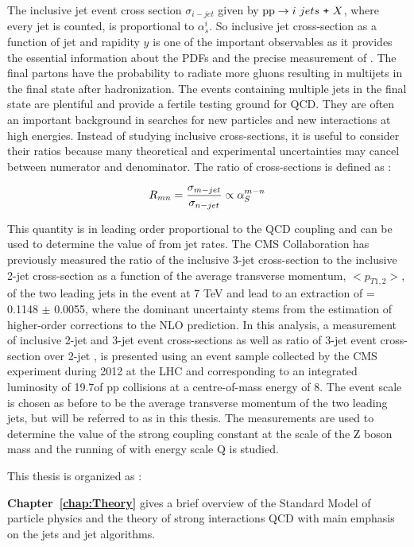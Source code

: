 The inclusive jet event cross section $\sigma_{i-jet}$ given by ${{\rm pp}\to i~jets~\texttt{+}~ X}$, where every jet is counted, is proportional to $\alpha^{i}_{s}$. So inclusive jet cross-section as a function of jet \pt and rapidity $y$ is one of the important observables as it provides the essential information about the PDFs and the precise measurement of \alps. The final partons have the probability to radiate more gluons resulting in multijets in the final state after hadronization. The events containing multiple jets in the final state are plentiful and provide a fertile testing ground for QCD. They are often an important background in searches for new particles and new interactions at high energies. Instead of studying inclusive cross-sections, it is useful to consider their ratios because many theoretical and experimental uncertainties may cancel between numerator and denominator. The ratio of cross-sections is defined as :

\begin{equation}
R_{mn} = \frac{\sigma_{m-jet}}{\sigma_{n-jet}} \propto \alps^{m-n}
\end{equation}

This quantity is in leading order proportional to the QCD coupling \alps and can be used to determine the value of \alps from jet rates. The CMS Collaboration has previously measured the ratio of the inclusive 3-jet cross-section to the inclusive 2-jet cross-section as a function of the average transverse momentum, $<p_{T1,2}>$, of the two leading jets in the event at 7 TeV \cite {Chatrchyan:2013txa} and lead to an extraction of \alpsmz = 0.1148 $\pm$ 0.0055, where the dominant uncertainty stems from the estimation of higher-order corrections to the NLO prediction. In this analysis, a measurement of inclusive 2-jet and 3-jet event cross-sections as well as ratio of 3-jet event cross-section over 2-jet \ratio, is presented using an event sample collected by the CMS experiment during 2012 at the LHC and corresponding to an integrated luminosity of 19.7\fbinv of pp collisions at a centre-of-mass energy of 8\TeV. The event scale is chosen as before to be the average transverse momentum of the two leading jets, but will be referred to as \httwo in this thesis. The measurements are used to determine the value of the strong coupling constant at the scale of the Z boson mass \alpsmz and the running of \alps with energy scale Q is studied.

This thesis is organized as :

{\bf Chapter~\ref{chap:Theory}} gives a brief overview of the Standard Model of particle physics and the theory of strong interactions QCD with main emphasis on the jets and jet algorithms. 


